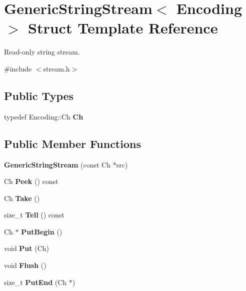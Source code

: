 \hypertarget{a02200}{}\section{Generic\+String\+Stream$<$ Encoding $>$ Struct Template Reference}
\label{a02200}


Read-\/only string stream.  




{\ttfamily \#include $<$stream.\+h$>$}

\subsection*{Public Types}
\begin{DoxyCompactItemize}
\item 
\mbox{\label{a02200_a4289aca895330084ff3168e37e4f08bd}} 
typedef Encoding\+::\+Ch {\bfseries Ch}
\end{DoxyCompactItemize}
\subsection*{Public Member Functions}
\begin{DoxyCompactItemize}
\item 
\mbox{\label{a02200_a6b20885ed64e33f5d081a1e83b07da06}} 
{\bfseries Generic\+String\+Stream} (const Ch $\ast$src)
\item 
\mbox{\label{a02200_a0c8fea9c2740c2953af9b3bb28bd469b}} 
Ch {\bfseries Peek} () const
\item 
\mbox{\label{a02200_a0d26e3e77e4fca64a87c2d71f48ac5e5}} 
Ch {\bfseries Take} ()
\item 
\mbox{\label{a02200_abc73d04baf4c7c58f383bc52536e8ac4}} 
size\+\_\+t {\bfseries Tell} () const
\item 
\mbox{\label{a02200_a88c908b4dac9773240ce4bca4b6dd837}} 
Ch $\ast$ {\bfseries Put\+Begin} ()
\item 
\mbox{\label{a02200_aaa59dc5313151a4125bf7840f87a33eb}} 
void {\bfseries Put} (Ch)
\item 
\mbox{\label{a02200_a5ff1a870d9334cd054cf4ca34c86ddc3}} 
void {\bfseries Flush} ()
\item 
\mbox{\label{a02200_a07b942bacda494afb3b2f7629cef14af}} 
size\+\_\+t {\bfseries Put\+End} (Ch $\ast$)
\end{DoxyCompactItemize}
